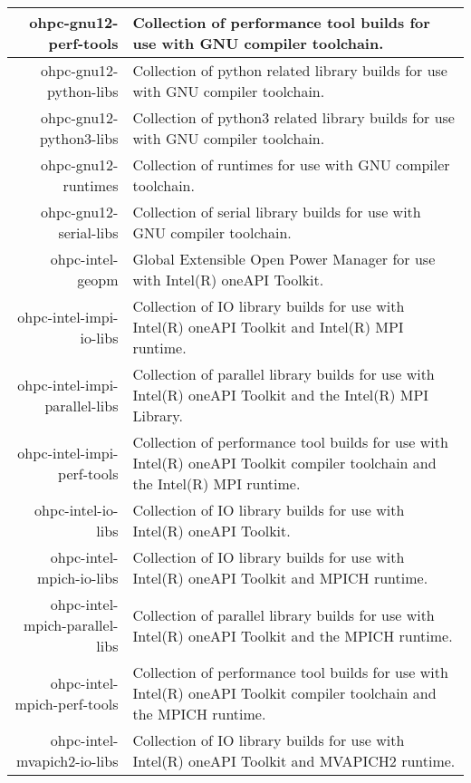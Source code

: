 \begin{tabularx}{\textwidth}{r|X}
\hline
ohpc-gnu12-perf-tools & Collection of performance tool builds for use with GNU compiler toolchain. \\ 
\hline
ohpc-gnu12-python-libs & Collection of python related library builds for use with GNU compiler toolchain. \\ 
\hline
ohpc-gnu12-python3-libs & Collection of python3 related library builds for use with GNU compiler toolchain. \\ 
\hline
ohpc-gnu12-runtimes & Collection of runtimes for use with GNU compiler toolchain. \\ 
\hline
ohpc-gnu12-serial-libs & Collection of serial library builds for use with GNU compiler toolchain. \\ 
\hline
ohpc-intel-geopm & Global Extensible Open Power Manager for use with Intel(R) oneAPI Toolkit. \\ 
\hline
ohpc-intel-impi-io-libs & Collection of IO library builds for use with Intel(R) oneAPI Toolkit and Intel(R) MPI runtime. \\ 
\hline
ohpc-intel-impi-parallel-libs & Collection of parallel library builds for use with Intel(R) oneAPI Toolkit and the Intel(R) MPI Library. \\ 
\hline
ohpc-intel-impi-perf-tools & Collection of performance tool builds for use with Intel(R) oneAPI Toolkit compiler toolchain and the Intel(R) MPI runtime. \\ 
\hline
ohpc-intel-io-libs & Collection of IO library builds for use with Intel(R) oneAPI Toolkit. \\ 
\hline
ohpc-intel-mpich-io-libs & Collection of IO library builds for use with Intel(R) oneAPI Toolkit and MPICH runtime. \\ 
\hline
ohpc-intel-mpich-parallel-libs & Collection of parallel library builds for use with Intel(R) oneAPI Toolkit and the MPICH runtime. \\ 
\hline
ohpc-intel-mpich-perf-tools & Collection of performance tool builds for use with Intel(R) oneAPI Toolkit compiler toolchain and the MPICH runtime. \\ 
\hline
ohpc-intel-mvapich2-io-libs & Collection of IO library builds for use with Intel(R) oneAPI Toolkit and MVAPICH2 runtime. \\ 
\hline
\bottomrule
\end{tabularx}
